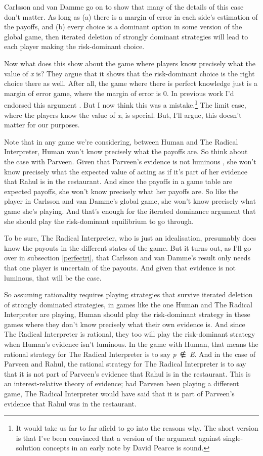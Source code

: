 \documentclass[
  11pt,
]{book}
\begin{document}
Carlsson and van Damme go on to show that many of the details of this case don't matter. As long as (a) there is a margin of error in each side's estimation of the payoffs, and (b) every choice is a dominant option in some version of the global game, then iterated deletion of strongly dominant strategies will lead to each player making the risk-dominant choice.

Now what does this show about the game where players know precisely what the value of \emph{x} is? They argue that it shows that the risk-dominant choice is the right choice there as well. After all, the game where there is perfect knowledge just is a margin of error game, where the margin of error is 0. In previous work I'd endorsed this argument \citep{Weatherson2018-WEAIEA-2}. But I now think this was a mistake.\footnote{It would take us far to far afield to go into the reasons why. The short version is that I've been convinced that a version of the argument against single-solution concepts in an early note by David Pearce \citeyearpar{Pearce1983} is sound.} The limit case, where the players know the value of \emph{x}, is special. But, I'll argue, this doesn't matter for our purposes.

Note that in any game we're considering, between Human and The Radical Interpreter, Human won't know precisely what the payoffs are. So think about the case with Parveen. Given that Parveen's evidence is not luminous \citep{Williamson2000}, she won't know precisely what the expected value of acting as if it's part of her evidence that Rahul is in the restaurant. And since the payoffs in a game table are expected payoffs, she won't know precisely what her payoffs are. So like the player in Carlsson and van Damme's global game, she won't know precisely what game she's playing. And that's enough for the iterated dominance argument that she should play the risk-dominant equilibrium to go through.

To be sure, The Radical Interpreter, who is just an idealisation, presumably does know the payouts in the different states of the game. But it turns out, as I'll go over in subsection \ref{perfectri}, that Carlsson and van Damme's result only needs that one player is uncertain of the payouts. And given that evidence is not luminous, that will be the case.

So assuming rationality requires playing strategies that survive iterated deletion of strongly dominated strategies, in games like the one Human and The Radical Interpreter are playing, Human should play the risk-dominant strategy in these games where they don't know precisely what their own evidence is. And since The Radical Interpreter is rational, they too will play the risk-dominant strategy when Human's evidence isn't luminous. In the game with Human, that means the rational strategy for The Radical Interpreter is to say \emph{p}~∉~\emph{E}. And in the case of Parveen and Rahul, the rational strategy for The Radical Interpreter is to say that it is not part of Parveen's evidence that Rahul is in the restaurant. This is an interest-relative theory of evidence; had Parveen been playing a different game, The Radical Interpreter would have said that it is part of Parveen's evidence that Rahul was in the restaurant.
\end{document}
